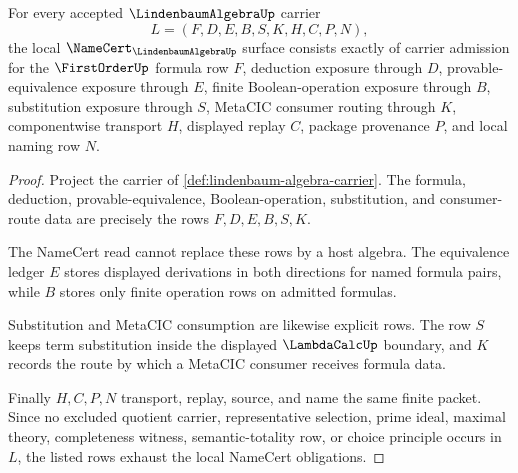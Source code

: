 \begin{theorem}
\label{thm:lindenbaum-algebra-namecert-obligations}
For every accepted $\LindenbaumAlgebraUp$ carrier
$$
L=(F,D,E,B,S,K,H,C,P,N),
$$
the local $\NameCert_{\LindenbaumAlgebraUp}$ surface consists exactly of carrier admission for the $\FirstOrderUp$ formula row $F$, deduction exposure through $D$, provable-equivalence exposure through $E$, finite Boolean-operation exposure through $B$, substitution exposure through $S$, MetaCIC consumer routing through $K$, componentwise transport $H$, displayed replay $C$, package provenance $P$, and local naming row $N$.
\end{theorem}
\begin{proof}
Project the carrier of \autoref{def:lindenbaum-algebra-carrier}. The formula, deduction, provable-equivalence, Boolean-operation, substitution, and consumer-route data are precisely the rows $F,D,E,B,S,K$.

The NameCert read cannot replace these rows by a host algebra. The equivalence ledger $E$ stores displayed derivations in both directions for named formula pairs, while $B$ stores only finite operation rows on admitted formulas.

Substitution and MetaCIC consumption are likewise explicit rows. The row $S$ keeps term substitution inside the displayed $\LambdaCalcUp$ boundary, and $K$ records the route by which a MetaCIC consumer receives formula data.

Finally $H,C,P,N$ transport, replay, source, and name the same finite packet. Since no excluded quotient carrier, representative selection, prime ideal, maximal theory, completeness witness, semantic-totality row, or choice principle occurs in $L$, the listed rows exhaust the local NameCert obligations.
\end{proof}

